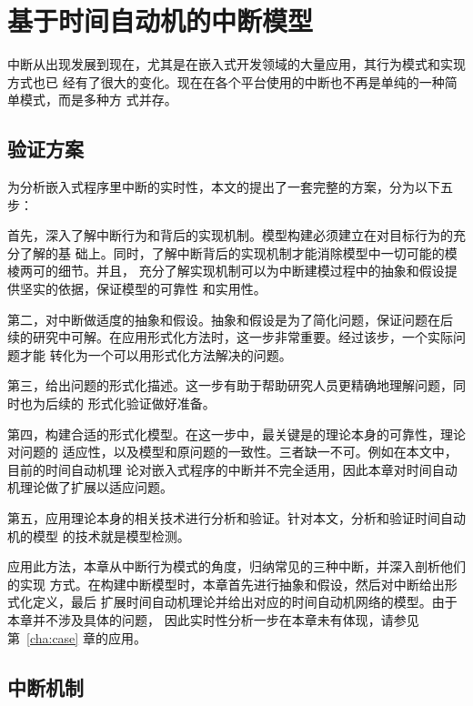 
\chapter{基于时间自动机的中断模型}
\label{cha:intr}

中断从出现发展到现在，尤其是在嵌入式开发领域的大量应用，其行为模式和实现方式也已
经有了很大的变化。现在在各个平台使用的中断也不再是单纯的一种简单模式，而是多种方
式并存。

\section{验证方案}
\label{sec:scheme}

为分析嵌入式程序里中断的实时性，本文的提出了一套完整的方案，分为以下五步：

首先，深入了解中断行为和背后的实现机制。模型构建必须建立在对目标行为的充分了解的基
础上。同时，了解中断背后的实现机制才能消除模型中一切可能的模棱两可的细节。并且，
充分了解实现机制可以为中断建模过程中的抽象和假设提供坚实的依据，保证模型的可靠性
和实用性。

第二，对中断做适度的抽象和假设。抽象和假设是为了简化问题，保证问题在后
续的研究中可解。在应用形式化方法时，这一步非常重要。经过该步，一个实际问题才能
转化为一个可以用形式化方法解决的问题。

第三，给出问题的形式化描述。这一步有助于帮助研究人员更精确地理解问题，同时也为后续的
形式化验证做好准备。

第四，构建合适的形式化模型。在这一步中，最关键是的理论本身的可靠性，理论对问题的
适应性，以及模型和原问题的一致性。三者缺一不可。例如在本文中，目前的时间自动机理
论对嵌入式程序的中断并不完全适用，因此本章对时间自动机理论做了扩展以适应问题。

第五，应用理论本身的相关技术进行分析和验证。针对本文，分析和验证时间自动机的模型
的技术就是模型检测。

应用此方法，本章从中断行为模式的角度，归纳常见的三种中断，并深入剖析他们的实现
方式。在构建中断模型时，本章首先进行抽象和假设，然后对中断给出形式化定义，最后
扩展时间自动机理论并给出对应的时间自动机网络的模型。由于本章并不涉及具体的问题，
因此实时性分析一步在本章未有体现，请参见第~\ref{cha:case} 章的应用。

\section{中断机制}
\label{sec:intr_machanism}

